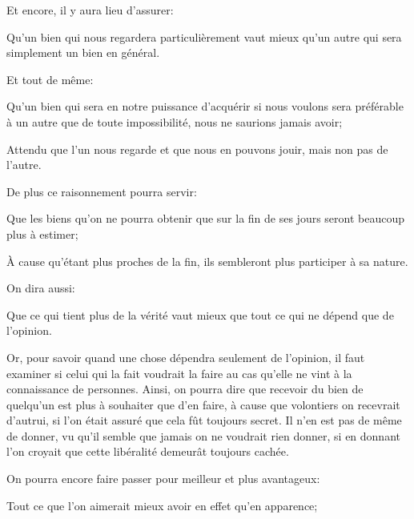 \bigbreak

Et encore, il y aura lieu d'assurer:

\begin{lieu}
  Qu'un bien qui nous regardera particulièrement vaut mieux qu'un autre qui sera simplement un bien en général.
\end{lieu}

Et tout de même:

\begin{lieu}
  Qu'un bien qui sera en notre puissance d'acquérir si nous voulons sera préférable à un autre que de toute
  impossibilité, nous ne saurions jamais avoir;
\end{lieu}

Attendu que l'un nous regarde et que nous en pouvons jouir, mais non pas de l'autre.

\bigbreak

De plus ce raisonnement pourra servir:

\begin{lieu}
  Que les biens qu'on ne pourra obtenir que sur la fin de ses jours seront beaucoup plus à estimer;
\end{lieu}

À cause qu'étant plus proches de la fin, ils sembleront plus participer à sa nature.

On dira aussi:

\begin{lieu}
  Que ce qui tient plus de la vérité vaut mieux que tout ce qui ne dépend que de l’opinion.
\end{lieu}

Or, pour savoir quand une chose dépendra seulement de l'opinion, il faut examiner si celui qui la fait voudrait la
faire au cas qu'elle ne vint à la connaissance de personnes. Ainsi, on pourra dire que recevoir du bien de quelqu'un
est plus à souhaiter que d'en faire, à cause que volontiers on recevrait d'autrui, si l'on était assuré que cela fût
toujours secret. Il n'en est pas de même de donner, vu qu'il semble que jamais on ne voudrait rien donner, si en donnant
l'on croyait que cette libéralité demeurât toujours cachée.

\bigbreak

On pourra encore faire passer pour meilleur et plus avantageux:

\begin{lieu}
  Tout ce que l'on aimerait mieux avoir en effet qu'en apparence;
\end{lieu}


